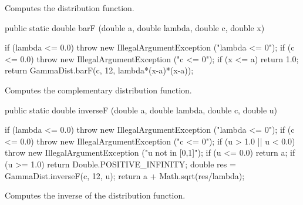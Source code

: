 \begin{tabb}  Computes the distribution function.
\end{tabb}
\begin{htmlonly}
\end{htmlonly}
\begin{code}

   public static double barF (double a, double lambda, double c, double x)\begin{hide} {
      if (lambda <= 0.0)
         throw new IllegalArgumentException ("lambda <= 0");
      if (c <= 0.0)
         throw new IllegalArgumentException ("c <= 0");
      if (x <= a)
         return 1.0;
      return GammaDist.barF(c, 12, lambda*(x-a)*(x-a));
   }\end{hide}
\end{code}
\begin{tabb}  Computes the complementary distribution function.
\end{tabb}
\begin{htmlonly}
\end{htmlonly}
\begin{code}

   public static double inverseF (double a, double lambda, double c,
                                  double u)\begin{hide} {
      if (lambda <= 0.0)
         throw new IllegalArgumentException ("lambda <= 0");
      if (c <= 0.0)
         throw new IllegalArgumentException ("c <= 0");
      if (u > 1.0 || u < 0.0)
         throw new IllegalArgumentException ("u not in [0,1]");
      if (u <= 0.0) return a;
      if (u >= 1.0)
         return Double.POSITIVE_INFINITY;
      double res = GammaDist.inverseF(c, 12, u);
      return a + Math.sqrt(res/lambda);
   }\end{hide}
\end{code}
\begin{tabb}  Computes the inverse of the distribution function.
\end{tabb}
\begin{htmlonly}
\end{htmlonly}
